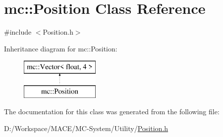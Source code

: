 \hypertarget{classmc_1_1_position}{}\section{mc\+:\+:Position Class Reference}
\label{classmc_1_1_position}


{\ttfamily \#include $<$Position.\+h$>$}

Inheritance diagram for mc\+:\+:Position\+:\begin{figure}[H]
\begin{center}
\leavevmode
\includegraphics[height=2.000000cm]{d1/dbc/classmc_1_1_position}
\end{center}
\end{figure}


The documentation for this class was generated from the following file\+:\begin{DoxyCompactItemize}
\item 
D\+:/\+Workspace/\+M\+A\+C\+E/\+M\+C-\/\+System/\+Utility/\hyperlink{_position_8h}{Position.\+h}\end{DoxyCompactItemize}
